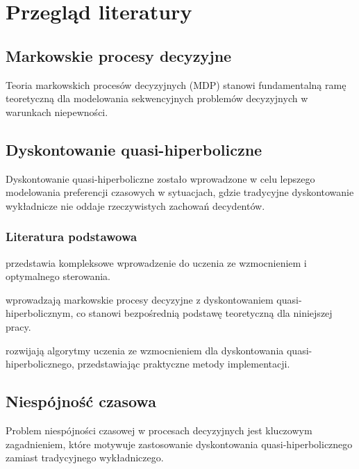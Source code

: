 \chapter{Przegląd literatury}

\section{Markowskie procesy decyzyjne}

Teoria markowskich procesów decyzyjnych (MDP) stanowi fundamentalną ramę teoretyczną dla modelowania sekwencyjnych problemów decyzyjnych w warunkach niepewności.

\section{Dyskontowanie quasi-hiperboliczne}

Dyskontowanie quasi-hiperboliczne zostało wprowadzone w celu lepszego modelowania preferencji czasowych w sytuacjach, gdzie tradycyjne dyskontowanie wykładnicze nie oddaje rzeczywistych zachowań decydentów.

\subsection{Literatura podstawowa}

\cite{bertsekas2019} przedstawia kompleksowe wprowadzenie do uczenia ze wzmocnieniem i optymalnego sterowania.

\cite{jaskiewicz2021} wprowadzają markowskie procesy decyzyjne z dyskontowaniem quasi-hiperbolicznym, co stanowi bezpośrednią podstawę teoretyczną dla niniejszej pracy.

\cite{eshwar2024} rozwijają algorytmy uczenia ze wzmocnieniem dla dyskontowania quasi-hiperbolicznego, przedstawiając praktyczne metody implementacji.

\section{Niespójność czasowa}

Problem niespójności czasowej w procesach decyzyjnych jest kluczowym zagadnieniem, które motywuje zastosowanie dyskontowania quasi-hiperbolicznego zamiast tradycyjnego wykładniczego.
